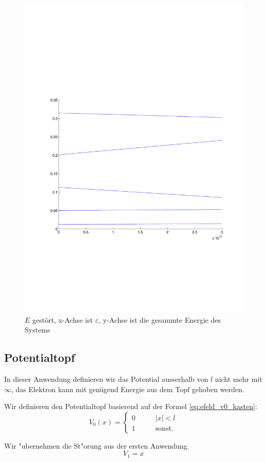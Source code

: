 \begin{refsection}
\begin{figure}
 \centering
 \includegraphics[width=12cm,clip=true,trim=2cm 7cm 1cm 8cm]{efeld/Energie_gestoert.pdf}
 \caption{$E$ gest\"ort, x-Achse ist $\varepsilon$, y-Achse ist die gesammte Energie des Systems}
 \label{abb:efeld_E_gestoert}
\end{figure}











\subsection{Potentialtopf}

In dieser Anwendung definieren wir das Potential ausserhalb von $l$ nicht mehr mit $\infty$, das Elektron kann mit genügend Energie aus dem Topf gehoben werden.

Wir definieren den Potentialtopf basierend auf der Formel \ref{eq:efeld_v0_kasten}:
\begin{equation}
  V_0(x)=\begin{cases}
    0       & \qquad |x|<l\\
    1  & \qquad\text{sonst.}
  \end{cases}
\end{equation}

Wir "ubernehmen die St"orung aus der ersten Anwendung.
\[
  V_1 = x
\]


\printbibliography[heading=subbibliography]
\end{refsection}
